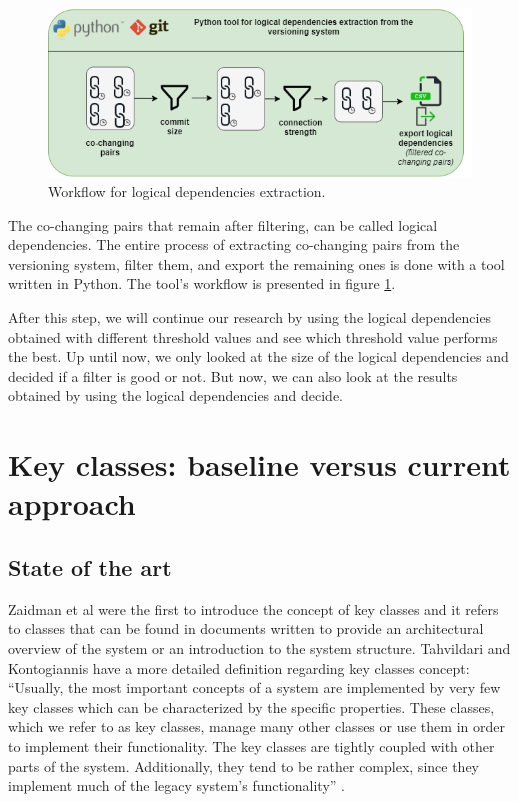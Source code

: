 \documentclass[runningheads]{comsis2}
\begin{document}
\begin{figure}
\centering
\includegraphics[width=\textwidth]{ld_workflow.png}
\caption{Workflow for logical dependencies extraction.}
\label{fig:workflow_key}
\centering
\end{figure}

The co-changing pairs that remain after filtering, can be called logical dependencies. The entire process of extracting co-changing pairs from the versioning system, filter them, and export the remaining ones is done with a tool written in Python. The tool's workflow is presented in figure \ref{fig:workflow_key}.

After this step, we will continue our research by using the logical dependencies obtained with different threshold values and see which threshold value performs the best. Up until now, we only looked at the size of the logical dependencies and decided if a filter is good or not. But now, we can also look at the results obtained by using the logical dependencies and decide.





\section{Key classes: baseline versus current approach}
\label{sec:baseline_approach}

\subsection{State of the art}

Zaidman et al \cite{ZaidmanJurnal} were the first to introduce the concept of key classes and it refers to classes that can be found in documents written to provide an architectural overview of the system or an introduction to the system structure. 
Tahvildari and Kontogiannis have a more detailed definition regarding key classes concept: “Usually, the most important concepts of a system are implemented by very few key classes which can be characterized by the specific properties. These classes, which we refer to as key classes, manage many other classes or use them in order to implement their functionality. The key classes are tightly coupled with other parts of the system. Additionally, they tend to be rather complex, since they implement much of the legacy system’s functionality” \cite{Tahvildari2004ImprovingDQ}.
\end{document}
